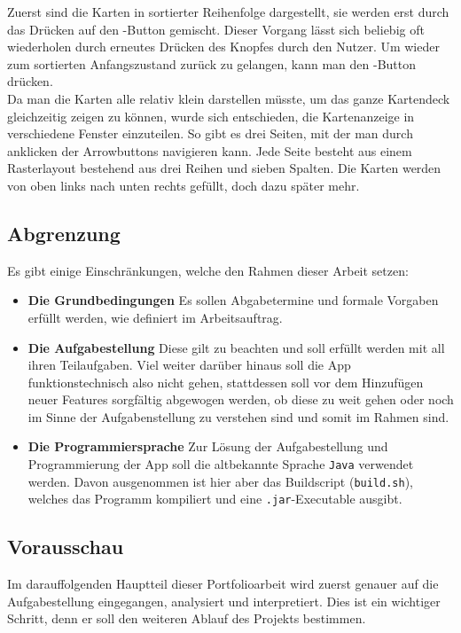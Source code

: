 \documentclass[a4paper,11pt]{article}
\begin{document}
Zuerst sind die Karten in sortierter Reihenfolge dargestellt, sie werden erst durch das Drücken auf den -Button gemischt. Dieser Vorgang lässt sich beliebig oft wiederholen durch erneutes Drücken des Knopfes durch den Nutzer. Um wieder zum sortierten Anfangszustand zurück zu gelangen, kann man den -Button drücken.\\

Da man die Karten alle relativ klein darstellen müsste, um das ganze Kartendeck gleichzeitig zeigen zu können, wurde sich entschieden, die Kartenanzeige in verschiedene Fenster einzuteilen. So gibt es drei Seiten, mit der man durch anklicken der Arrowbuttons navigieren kann. Jede Seite besteht aus einem Rasterlayout bestehend aus drei Reihen und sieben Spalten. Die Karten werden von oben links nach unten rechts gefüllt, doch dazu später mehr.\\


\subsection{Abgrenzung}
Es gibt einige Einschränkungen, welche den Rahmen dieser Arbeit setzen:

\begin{itemize}
    \item \textbf{Die Grundbedingungen} Es sollen Abgabetermine und formale Vorgaben erfüllt werden, wie definiert im Arbeitsauftrag.
    \item \textbf{Die Aufgabestellung} Diese gilt zu beachten und soll erfüllt werden mit all ihren Teilaufgaben. Viel weiter darüber hinaus soll die App funktionstechnisch also nicht gehen, stattdessen soll vor dem Hinzufügen neuer Features sorgfältig abgewogen werden, ob diese zu weit gehen oder noch im Sinne der Aufgabenstellung zu verstehen sind und somit im Rahmen sind.
    \item \textbf{Die Programmiersprache} Zur Lösung der Aufgabestellung und Programmierung der App soll die altbekannte Sprache \texttt{Java} verwendet werden. Davon ausgenommen ist hier aber das Buildscript (\texttt{build.sh}), welches das Programm kompiliert und eine \texttt{.jar}-Executable ausgibt.
\end{itemize}

\subsection{Vorausschau}

Im darauffolgenden Hauptteil dieser Portfolioarbeit wird zuerst genauer auf die Aufgabestellung eingegangen, analysiert und interpretiert. Dies ist ein wichtiger Schritt, denn er soll den weiteren Ablauf des Projekts bestimmen.\\
\end{document}
